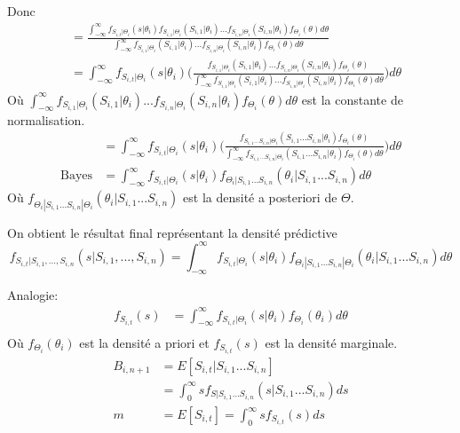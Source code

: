 Donc
\begin{align*}
&= \frac{\int_{-\infty}^{\infty} f_{S_{i,t}|\Theta_i}(s|\theta_i)f_{S_{i,1}|\Theta_i}(S_{i,1}|\theta_i)...f_{S_{i,n}|\Theta_i}(S_{i,n}|\theta_i) f_{\Theta_i}(\theta)d\theta}{\int_{-\infty}^{\infty} f_{S_{i,1}|\Theta_i}(S_{i,1}|\theta_i)...f_{S_{i,n}|\Theta_i}(S_{i,n}|\theta_i) f_{\Theta_i}(\theta)d\theta}  \\
&= \int_{-\infty}^{\infty} f_{S_{i,t}|\Theta_i}(s|\theta_i) \Bigg( \frac{f_{S_{i,1}|\Theta_i}(S_{i,1}|\theta_i)...f_{S_{i,n}|\Theta_i}(S_{i,n}|\theta_i) f_{\Theta_i}(\theta)}{\int_{-\infty}^{\infty} f_{S_{i,1}|\Theta_i}(S_{i,1}|\theta_i)...f_{S_{i,n}|\Theta_i}(S_{i,n}|\theta_i) f_{\Theta_i}(\theta)d\theta} \Bigg) d\theta
\end{align*}
Où $\int_{-\infty}^{\infty} f_{S_{i,1}|\Theta_i}(S_{i,1}|\theta_i)...f_{S_{i,n}|\Theta_i}(S_{i,n}|\theta_i) f_{\Theta_i}(\theta)d\theta$ est la constante de normalisation.
\begin{align*}
&=\int_{-\infty}^{\infty} f_{S_{i,t}|\Theta_i}(s|\theta_i) \Bigg( \frac{f_{S_{i,1}...S_{i,n}|\Theta_i}(S_{i,1}...S_{i,n}|\theta_i)f_{\Theta_i}(\theta)}{\int_{-\infty}^{\infty} f_{S_{i,1}...S_{i,n}|\Theta_i}(S_{i,1}...S_{i,n}|\theta_i)f_{\Theta_i}(\theta)d\theta} \Bigg) d\theta \\
\text{Bayes} &= \int_{-\infty}^{\infty} f_{S_{i,t}|\Theta_i}(s|\theta_i) f_{\Theta_i|S_{i,1}...S_{i,n}}(\theta_i|S_{i,1}...S_{i,n}) d\theta 
\end{align*}
Où $f_{\Theta_i|S_{i,1}...S_{i,n}|\Theta_i}(\theta_i|S_{i,1}...S_{i,n})$ est la densité a posteriori de $\Theta$.

On obtient le résultat final représentant la densité prédictive
\begin{equation}
f_{S_{i,t}|S_{i,1}, ..., S_{i,n}}(s|S_{i,1}, ..., S_{i,n}) = \int_{-\infty}^{\infty} f_{S_{i,t}|\Theta_i}(s|\theta_i) f_{\Theta_i|S_{i,1}...S_{i,n}|\Theta_i}(\theta_i|S_{i,1}...S_{i,n}) d\theta
\end{equation}

Analogie:
\begin{align*}
f_{S_{i,t}}(s) &= \int_{-\infty}^{\infty} f_{S_{i,t}|\Theta_i}(s|\theta_i) f_{\Theta_i}(\theta_i) d\theta \\ 
\end{align*}
Où $f_{\Theta_i}(\theta_i)$ est la densité a priori et $f_{S_{i,t}}(s)$ est la densité marginale.
\begin{align*}
B_{i,n+1} &= E[S_{i,t}| S_{i,1}...S_{i,n}] \\
&= \int_{0}^{\infty} s f_{S|S_{i,1}...S_{i,n}}(s|S_{i,1}...S_{i,n})ds\\
m &= E[S_{i,t}] = \int_{0}^{\infty} s f_{S_{i,t}}(s)ds\\
\end{align*}

